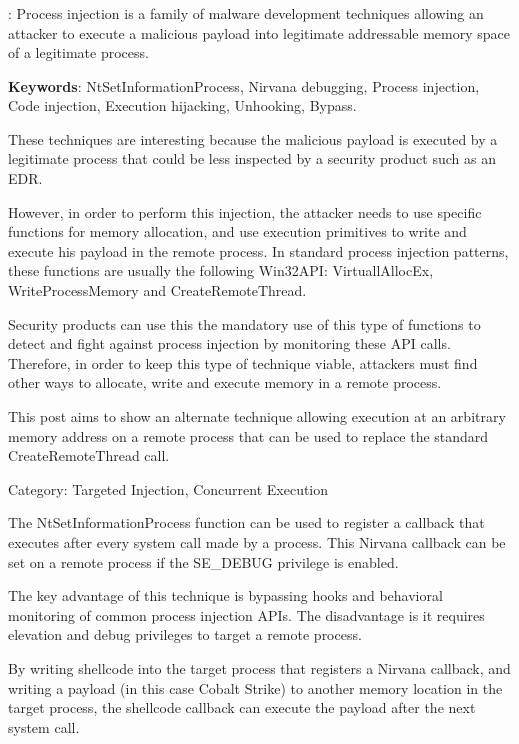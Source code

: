 \documentclass{article}
\begin{document}
\subsubsection{\textcite{Dequeker:2023}}
\textbf{}: Process injection is a family of malware development techniques allowing an attacker to execute a malicious payload into legitimate addressable memory space of a legitimate process.

\textbf{Keywords}: NtSetInformationProcess, Nirvana debugging, Process injection, Code injection, Execution hijacking, Unhooking, Bypass.

These techniques are interesting because the malicious payload is executed by a legitimate process that could be less inspected by a security product such as an EDR.

However, in order to perform this injection, the attacker needs to use specific functions for memory allocation, and use execution primitives to write and execute his payload in the remote process. In standard process injection patterns, these functions are usually the following Win32API: VirtuallAllocEx, WriteProcessMemory and CreateRemoteThread.
 
Security products can use this the mandatory use of this type of functions to detect and fight against process injection by monitoring these API calls. Therefore, in order to keep this type of technique viable, attackers must find other ways to allocate, write and execute memory in a remote process.

This post aims to show an alternate technique allowing execution at an arbitrary memory address on a remote process that can be used to replace the standard CreateRemoteThread call.

Category: Targeted Injection, Concurrent Execution

The NtSetInformationProcess function can be used to register a callback that executes after every system call made by a process. This Nirvana callback can be set on a remote process if the SE\_DEBUG privilege is enabled.

The key advantage of this technique is bypassing hooks and behavioral monitoring of common process injection APIs. The disadvantage is it requires elevation and debug privileges to target a remote process.

By writing shellcode into the target process that registers a Nirvana callback, and writing a payload (in this case Cobalt Strike) to another memory location in the target process, the shellcode callback can execute the payload after the next system call.
\end{document}

